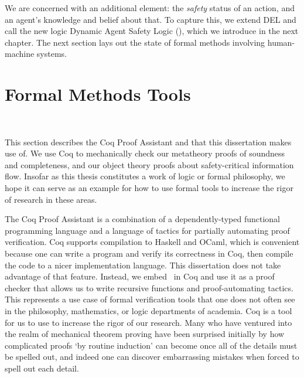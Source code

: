 We are concerned with an additional element: the \emph{safety} status of an action, and an agent's knowledge and belief about that. To capture this, we extend DEL and call the new logic Dynamic Agent Safety Logic (\DASL), which we introduce in the next chapter. The next section lays out the state of formal methods involving human-machine systems.

\section{Formal Methods Tools}~\label{sec:fm}

This section describes the Coq Proof Assistant \cite{coq_ref} and that this dissertation makes use of. We use Coq to mechanically check our metatheory proofs of soundness and completeness, and our object theory proofs about safety-critical information flow. Insofar as this thesis constitutes a work of logic or formal philosophy, we hope it can serve as an example for how to use formal tools to increase the rigor of research in these areas.

The Coq Proof Assistant is a combination of a dependently-typed functional programming language and a language of tactics for partially automating proof verification. Coq supports compilation to Haskell and OCaml, which is convenient because one can write a program and verify its correctness in Coq, then compile the code to a nicer implementation language. This dissertation does not take advantage of that feature. Instead, we embed \DASL\ in Coq and use it as a proof checker that allows us to write recursive functions and proof-automating tactics. This represents a use case of formal verification tools that one does not often see in the philosophy, mathematics, or logic departments of academia. Coq is a tool for us to use to increase the rigor of our research. Many who have ventured into the realm of mechanical theorem proving have been surprised initially by how complicated proofs `by routine induction' can become once all of the details must be spelled out, and indeed one can discover embarrassing mistakes when forced to spell out each detail.


